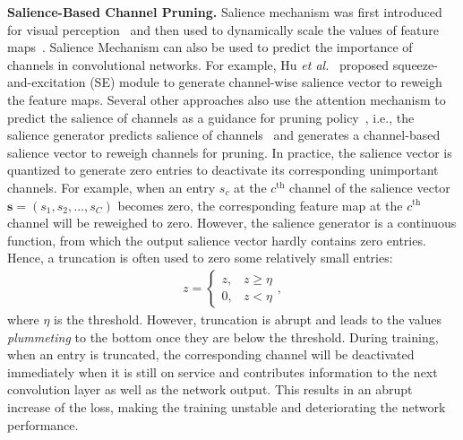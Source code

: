 \documentclass[lettersize,journal]{IEEEtran}
\begin{document}
\textbf{Salience-Based Channel Pruning.} 
Salience mechanism was first introduced for visual perception~\cite{corbetta2002control,itti1998model,rensink2000dynamic} and then used to dynamically scale the values of feature maps~\cite{hu2018squeeze,park2018bam,ulutan2020vsgnet,wang2017residual,woo2018cbam,xu2016ask}. Salience Mechanism can also be used to predict the importance of channels in convolutional networks. For example, Hu \textit{et al.}~\cite{hu2018squeeze} proposed squeeze-and-excitation (SE) module to generate channel-wise salience vector to reweigh the feature maps. Several other approaches also use the attention mechanism to predict the salience of channels as a guidance for pruning policy~\cite{bejnordi2019batch,chen2019self,gao2018dynamic,herrmann2018end,guo2020model,xia2021fully,su2020dynamic,bochkovskiy2020yolov4,tang2021manifold,li2021dynamic}, i.e., the salience generator predicts salience of channels~\cite{hu2018squeeze,tang2021manifold} and generates a channel-based salience vector to 
reweigh channels for pruning. In practice, the salience vector is quantized to generate zero entries to
deactivate its corresponding unimportant channels. For example, when an entry $s_c$ at the $c^{\text{th}}$ channel of the salience vector $\boldsymbol{s}=(s_{1},s_{2},...,s_{C})$ becomes zero, the corresponding feature map at the $c^{\text{th}}$ channel will be reweighed to zero. However, the salience generator is a continuous function, from which the output salience vector hardly contains zero entries. Hence, a truncation is often used to zero some relatively small entries:
\begin{align}
  z
  = \left\{
            \begin{array}{cl}
                z ,  & z\geq\eta \\
                0 , & z<\eta
            \end{array}
            \right. ,
\end{align}
where $\eta$ is the threshold. 
However, truncation is abrupt and leads to the values \emph{plummeting} to the bottom once they are below the threshold. During training, when an entry is truncated, the corresponding channel will be deactivated immediately when it is still on service and contributes information to the next convolution layer as well as the network output. This results in an abrupt increase of the loss, making the training unstable and deteriorating the network performance.
\end{document}
